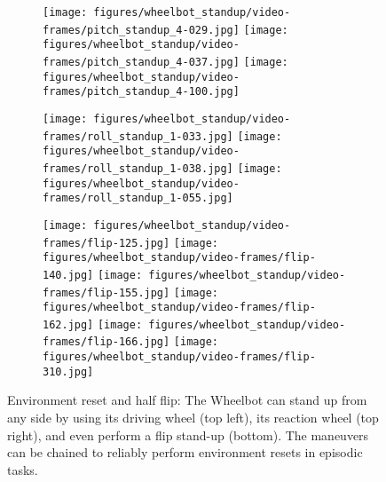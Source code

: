 \begin{figure}[tb]
    \begin{subfigure}{1.6in}
        \texttt{[image: figures/wheelbot\_standup/video-frames/pitch\_standup\_4-029.jpg]}%
        \texttt{[image: figures/wheelbot\_standup/video-frames/pitch\_standup\_4-037.jpg]}%
        \texttt{[image: figures/wheelbot\_standup/video-frames/pitch\_standup\_4-100.jpg]}%
    \end{subfigure}
    \begin{subfigure}{1.6in}
        \texttt{[image: figures/wheelbot\_standup/video-frames/roll\_standup\_1-033.jpg]}%
        \texttt{[image: figures/wheelbot\_standup/video-frames/roll\_standup\_1-038.jpg]}%
        \texttt{[image: figures/wheelbot\_standup/video-frames/roll\_standup\_1-055.jpg]}%
    \end{subfigure}
    \begin{subfigure}{1.8in}%
        \label{fig:standup:pitch}
    \end{subfigure}%
    \begin{subfigure}{1.2in}%
        \label{fig:standup:roll}
    \end{subfigure}%
    \vspace{1em}
    \begin{subfigure}{3.2in}
        \texttt{[image: figures/wheelbot\_standup/video-frames/flip-125.jpg]}%
        \texttt{[image: figures/wheelbot\_standup/video-frames/flip-140.jpg]}%
        \texttt{[image: figures/wheelbot\_standup/video-frames/flip-155.jpg]}%
        \texttt{[image: figures/wheelbot\_standup/video-frames/flip-162.jpg]}%
        \texttt{[image: figures/wheelbot\_standup/video-frames/flip-166.jpg]}%
        \texttt{[image: figures/wheelbot\_standup/video-frames/flip-310.jpg]}%
    \end{subfigure}
    \begin{subfigure}{3.2in}
        \label{fig:standup:flip}
    \end{subfigure}
    \caption{Environment reset and half flip: The Wheelbot can stand up from any side by using its driving wheel (top left), its reaction wheel (top right), and even perform a flip stand-up (bottom). The maneuvers can be chained to reliably perform environment resets in episodic tasks.}
    \label{fig:standup}
\end{figure}

